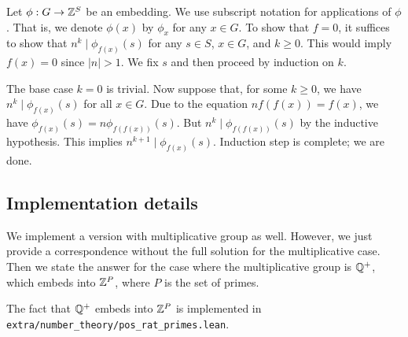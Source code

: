 Let $\phi : G \to \mathbb{Z}^S$ be an embedding.
We use subscript notation for applications of $\phi$.
That is, we denote $\phi(x)$ by $\phi_x$ for any $x \in G$.
To show that $f = 0$, it suffices to show that $n^k \mid \phi_{f(x)}(s)$ for any $s \in S$, $x \in G$, and $k \geq 0$.
This would imply $f(x) = 0$ since $|n| > 1$.
We fix $s$ and then proceed by induction on $k$.

The base case $k = 0$ is trivial.
Now suppose that, for some $k \geq 0$, we have $n^k \mid \phi_{f(x)}(s)$ for all $x \in G$.
Due to the equation $n f(f(x)) = f(x)$, we have $\phi_{f(x)}(s) = n \phi_{f(f(x))}(s)$.
But $n^k \mid \phi_{f(f(x))}(s)$ by the inductive hypothesis.
This implies $n^{k + 1} \mid \phi_{f(x)}(s)$.
Induction step is complete; we are done.



\subsection*{Implementation details}

We implement a version with multiplicative group as well.
However, we just provide a correspondence without the full solution for the multiplicative case.
Then we state the answer for the case where the multiplicative group is $\mathbb{Q}^+$, which embeds into $\mathbb{Z}^P$, where $P$ is the set of primes.

The fact that $\mathbb{Q}^+$ embeds into $\mathbb{Z}^P$ is implemented in \texttt{extra/number\_theory/pos\_rat\_primes.lean}.




